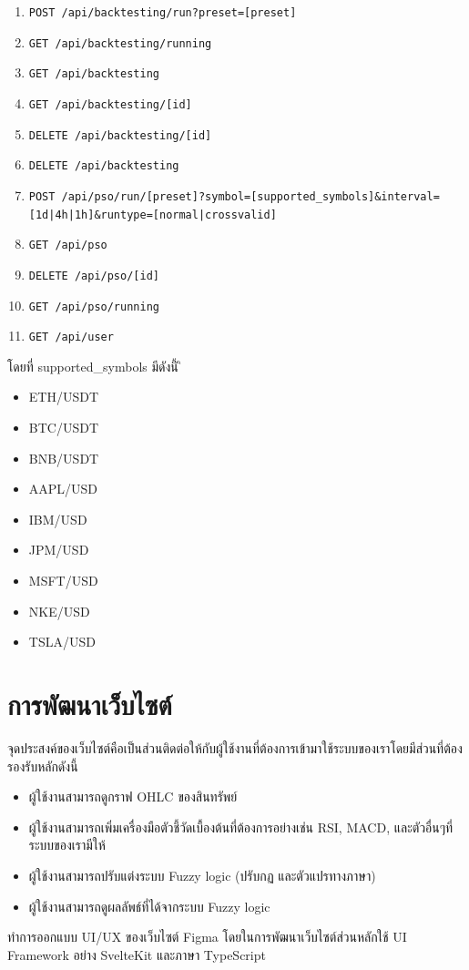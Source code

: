 \begin{enumerate}
    \item \texttt{POST /api/backtesting/run?preset=[preset]}
    \item \texttt{GET /api/backtesting/running}
    \item \texttt{GET /api/backtesting}
    \item \texttt{GET /api/backtesting/[id]}
    \item \texttt{DELETE /api/backtesting/[id]}
    \item \texttt{DELETE /api/backtesting}
    
    \item \texttt{POST /api/pso/run/[preset]?symbol=[supported\_symbols]\&interval=[1d|4h|1h]\&runtype=[normal|crossvalid]}
    \item \texttt{GET /api/pso}
    \item \texttt{DELETE /api/pso/[id]}
    \item  \texttt{GET /api/pso/running}
    
    \item \texttt{GET /api/user} 
\end{enumerate}
โดยที่ supported\_symbols มีดังนี้
ิ\begin{itemize}
    \item ETH/USDT
    \item BTC/USDT
    \item BNB/USDT
    \item AAPL/USD
    \item IBM/USD
    \item JPM/USD
    \item MSFT/USD
    \item NKE/USD
    \item TSLA/USD
\end{itemize}

\section{การพัฒนาเว็บไซต์}
จุดประสงค์ของเว็บไซต์คือเป็นส่วนติดต่อให้กับผู้ใช้งานที่ต้องการเข้ามาใช้ระบบของเราโดยมีส่วนที่ต้องรองรับหลักดังนี้
\begin{itemize}
    \item ผู้ใช้งานสามารถดูกราฟ OHLC ของสินทรัพย์
    \item ผู้ใช้งานสามารถเพิ่มเครื่องมือตัวชี้วัดเบื้องต้นที่ต้องการอย่างเช่น RSI, MACD, และตัวอื่นๆที่ระบบของเรามีให้
    \item ผู้ใช้งานสามารถปรับแต่งระบบ Fuzzy logic (ปรับกฏ และตัวแปรทางภาษา)
    \item ผู้ใช้งานสามารถดูผลลัพธ์ที่ได้จากระบบ Fuzzy logic
\end{itemize}
ทำการออกแบบ UI/UX ของเว็บไซต์ Figma
โดยในการพัฒนาเว็บไซต์ส่วนหลักใช้ UI Framework อย่าง SvelteKit และภาษา TypeScript

